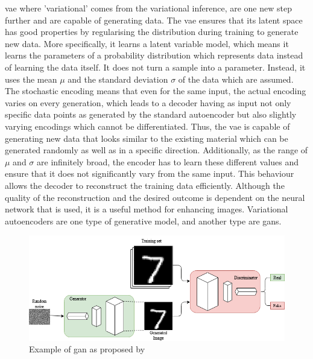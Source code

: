 \par
\Acrlong{vae} where 'variational' comes from the variational inference, are one new step further and are capable of generating data. The \gls{vae} ensures that its latent space has good properties by regularising the distribution during training to generate new data. More specifically, it learns a latent variable model, which means it learns the parameters of a probability distribution which represents data instead of learning the data itself. It does not turn a sample into a parameter. Instead, it uses the mean \(\mu\) and the standard deviation \(\sigma\) of the data which are assumed. The stochastic encoding means that even for the same input, the actual encoding varies on every generation, which leads to a decoder having as input not only specific data points as generated by the standard autoencoder but also slightly varying encodings which cannot be differentiated. Thus, the \gls{vae} is capable of generating new data that looks similar to the existing material which can be generated randomly as well as in a specific direction. Additionally, as the range of \(\mu\) and \(\sigma\) are infinitely broad, the encoder has to learn these different values and ensure that it does not significantly vary from the same input. This behaviour allows the decoder to reconstruct the training data efficiently. Although the quality of the reconstruction and the desired outcome is dependent on the neural network that is used, it is a useful method for enhancing images. Variational autoencoders are one type of generative model, and another type are \glspl{gan}.

\begin{figure}[htbp!]
    \includegraphics[width=\textwidth,height=\textheight,keepaspectratio]{logos/GANSchematic.png}
     \caption{Example of \acrshort{gan} as proposed by \cite{Goodfellow2014}}
    \label{fig:ganfigure}
\end{figure}

